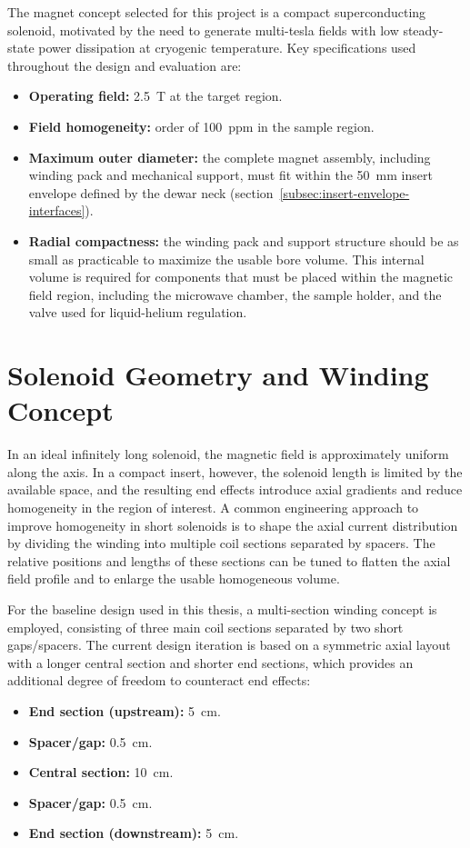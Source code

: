 \documentclass[FM,DP,EN,twoside]{tulthesis}
\begin{document}
The magnet concept selected for this project is a compact superconducting solenoid, motivated by the need to generate multi-tesla fields with low steady-state power dissipation at cryogenic temperature. Key specifications used throughout the design and evaluation are:
\begin{itemize}
  \item \textbf{Operating field:} \SI{2.5}{\tesla} at the target region.
  \item \textbf{Field homogeneity:} order of \SI{100}{ppm} in the sample region.
  \item \textbf{Maximum outer diameter:} the complete magnet assembly, including winding pack and mechanical support, must fit within the \SI{50}{\milli\meter} insert envelope defined by the dewar neck (section~\ref{subsec:insert-envelope-interfaces}).
  \item \textbf{Radial compactness:} the winding pack and support structure should be as small as practicable to maximize the usable bore volume. This internal volume is required for components that must be placed within the magnetic field region, including the microwave chamber, the sample holder, and the valve used for liquid-helium regulation.
\end{itemize}

\section{Solenoid Geometry and Winding Concept}
\label{sec:solenoid-geometry-winding}
In an ideal infinitely long solenoid, the magnetic field is approximately uniform along the axis. In a compact insert, however, the solenoid length is limited by the available space, and the resulting end effects introduce axial gradients and reduce homogeneity in the region of interest. A common engineering approach to improve homogeneity in short solenoids is to shape the axial current distribution by dividing the winding into multiple coil sections separated by spacers. The relative positions and lengths of these sections can be tuned to flatten the axial field profile and to enlarge the usable homogeneous volume.

For the baseline design used in this thesis, a multi-section winding concept is employed, consisting of three main coil sections separated by two short gaps/spacers. The current design iteration is based on a symmetric axial layout with a longer central section and shorter end sections, which provides an additional degree of freedom to counteract end effects:
\begin{itemize}
  \item \textbf{End section (upstream):} \SI{5}{\centi\meter}.
  \item \textbf{Spacer/gap:} \SI{0.5}{\centi\meter}.
  \item \textbf{Central section:} \SI{10}{\centi\meter}.
  \item \textbf{Spacer/gap:} \SI{0.5}{\centi\meter}.
  \item \textbf{End section (downstream):} \SI{5}{\centi\meter}.
\end{itemize}
\end{document}
